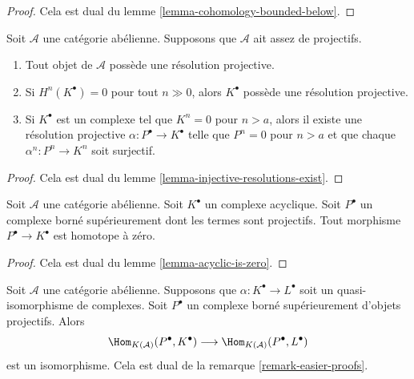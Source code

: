 \begin{proof}
Cela est dual du lemme \ref{lemma-cohomology-bounded-below}.
\end{proof}

\begin{lemma}
\label{lemma-projective-resolutions-exist}
Soit $\mathcal{A}$ une catégorie abélienne. Supposons que $\mathcal{A}$ ait
assez de projectifs.
\begin{enumerate}
\item Tout objet de $\mathcal{A}$ possède une résolution projective.
\item Si $H^n(K^\bullet) = 0$ pour tout $n \gg 0$, alors $K^\bullet$ possède
une résolution projective.
\item Si $K^\bullet$ est un complexe tel que $K^n = 0$ pour $n > a$, alors il
existe une résolution projective $\alpha : P^\bullet \to K^\bullet$ telle que
$P^n = 0$ pour $n > a$ et que chaque $\alpha^n : P^n \to K^n$ soit surjectif.
\end{enumerate}
\end{lemma}

\begin{proof}
Cela est dual du lemme \ref{lemma-injective-resolutions-exist}.
\end{proof}

\begin{lemma}
\label{lemma-projective-into-acyclic-is-zero}
Soit $\mathcal{A}$ une catégorie abélienne. Soit $K^\bullet$ un complexe
acyclique. Soit $P^\bullet$ un complexe borné supérieurement dont les termes
sont projectifs. Tout morphisme $P^\bullet \to K^\bullet$ est homotope à zéro.
\end{lemma}

\begin{proof}
Cela est dual du lemme \ref{lemma-acyclic-is-zero}.
\end{proof}

\begin{remark}
\label{remark-easier-projective}
Soit $\mathcal{A}$ une catégorie abélienne. Supposons que
$\alpha : K^\bullet \to L^\bullet$ soit un quasi-isomorphisme de complexes.
Soit $P^\bullet$ un complexe borné supérieurement d'objets projectifs. Alors
$$
\Hom_{K(\mathcal{A})}(P^\bullet, K^\bullet)
\longrightarrow
\Hom_{K(\mathcal{A})}(P^\bullet, L^\bullet)
$$
est un isomorphisme. Cela est dual de la remarque
\ref{remark-easier-proofs}.
\end{remark}

